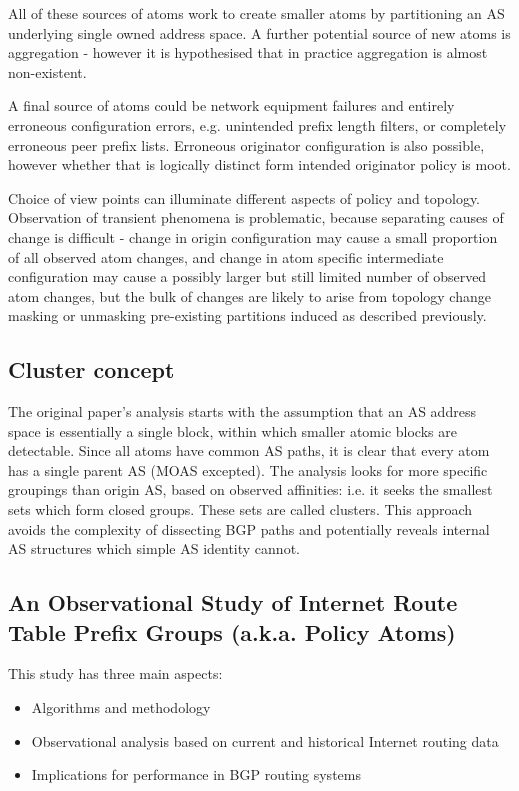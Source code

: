 All of these sources of atoms work to create smaller atoms by partitioning an AS underlying single owned address space. A further potential source of new atoms is aggregation - however it is hypothesised that in practice aggregation is almost non-existent.

A final source of atoms could be network equipment failures and entirely erroneous configuration errors, e.g. unintended prefix length filters, or completely erroneous peer prefix lists. Erroneous originator configuration is also possible, however whether that is logically distinct form intended originator policy is moot.

Choice of view points can illuminate different aspects of policy and topology. Observation of transient phenomena is problematic, because separating causes of change is difficult - change in origin configuration may cause a small proportion of all observed atom changes, and change in atom specific intermediate configuration may cause a possibly larger but still limited number of observed atom changes, but the bulk of changes are likely to arise from topology change masking or unmasking pre-existing partitions induced as described previously.

\subsection{Cluster concept}

The original paper's analysis starts with the assumption that an AS address space is essentially a single block, within which smaller atomic blocks are detectable. Since all atoms have common AS paths, it is clear that every atom has a single parent AS (MOAS excepted). The analysis looks for more specific groupings than origin AS, based on observed affinities: i.e. it seeks the smallest sets which form closed groups. These sets are called clusters. This approach avoids the complexity of dissecting BGP paths and potentially reveals internal AS structures which simple AS identity cannot.

\subsection{An Observational Study of Internet Route Table Prefix Groups (a.k.a. Policy Atoms)}

This study has three main aspects:

\begin{itemize}
	\item Algorithms and methodology
	\item Observational analysis based on current and historical Internet routing data
	\item Implications for performance in BGP routing systems
\end{itemize}

